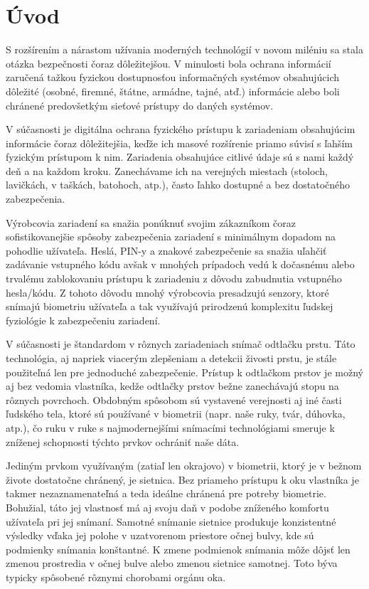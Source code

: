 
\chapter{Úvod}
S rozšírením a nárastom užívania moderných technológií v novom miléniu sa stala otázka bezpečnosti čoraz dôležitejšou. V minulosti bola ochrana informácií zaručená tažkou fyzickou dostupnosťou informačných systémov obsahujúcich dôležité (osobné, firemné, štátne, armádne, tajné, atď.) informácie alebo boli chránené predovšetkým sieťové prístupy do daných systémov.

V súčasnosti je digitálna ochrana fyzického prístupu k zariadeniam obsahujúcim informácie čoraz dôležitejšia, keďže ich masové rozšírenie priamo súvisí s ľahším fyzickým prístupom k nim. Zariadenia obsahujúce citlivé údaje sú s nami každý deň a na každom kroku. Zanechávame ich na verejných miestach (stoloch, lavičkách, v taškách, batohoch, atp.), často ľahko dostupné a bez dostatočného zabezpečenia.

Výrobcovia zariadení sa snažia ponúknuť svojim zákazníkom čoraz sofistikovanejšie spôsoby zabezpečenia zariadení s minimálnym dopadom na pohodlie užívateľa. Heslá, PIN-y a znakové zabezpečenie sa snažia uľahčiť zadávanie vstupného kódu avšak v mnohých prípadoch vedú k dočasnému alebo trvalému zablokovaniu prístupu k zariadeniu z dôvodu zabudnutia vstupného hesla/kódu. Z tohoto dôvodu mnohý výrobcovia presadzujú senzory, ktoré snímajú biometriu užívateľa a tak využívajú prirodzenú komplexitu ľudskej fyziológie k zabezpečeniu zariadení.

V súčasnosti je štandardom v rôznych zariadeniach snímač odtlačku prstu. Táto technológia, aj napriek viacerým zlepšeniam a detekcii živosti prstu, je stále použiteľná len pre jednoduché zabezpečenie. Prístup k odtlačkom prstov je možný aj bez vedomia vlastníka, kedže odtlačky prstov bežne zanechávajú stopu na rôznych povrchoch. Obdobným spôsobom sú vystavené verejnosti aj iné časti ľudského tela, ktoré sú používané v biometrii (napr. naše ruky, tvár, dúhovka, atp.), čo ruku v ruke s najmodernejšími snímacími technológiami smeruje k zníženej schopnosti týchto prvkov ochrániť naše dáta.

Jediným prvkom využívaným (zatiaľ len okrajovo) v biometrii, ktorý je v bežnom živote dostatočne chránený, je sietnica. Bez priameho prístupu k oku vlastníka je takmer nezaznamenateľná a teda ideálne chránená pre potreby biometrie. Bohužial, táto jej vlastnosť má aj svoju daň v podobe zníženého komfortu užívateľa pri jej snímaní.
Samotné snímanie sietnice produkuje konzistentné výsledky vďaka jej polohe v uzatvorenom priestore očnej bulvy, kde sú podmienky snímania konštantné. K zmene podmienok snímania môže dôjsť len zmenou prostredia v očnej bulve alebo zmenou sietnice samotnej. Toto býva typicky spôsobené rôznymi chorobami orgánu oka.

